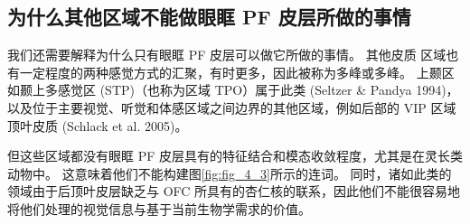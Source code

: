 \subsection{为什么其他区域不能做眼眶 PF 皮层所做的事情}
我们还需要解释为什么只有眼眶 PF 皮层可以做它所做的事情。 其他皮质
区域也有一定程度的两种感觉方式的汇聚，有时更多，因此被称为多峰或多峰。 上颞区如颞上多感觉区 (STP)（也称为区域 TPO）属于此类
(Seltzer \& Pandya 1994)，以及位于主要视觉、听觉和体感区域之间边界的其他区域，例如后部的 VIP 区域顶叶皮质 (Schlack et al. 2005)。\par
但这些区域都没有眼眶 PF 皮层具有的特征结合和模态收敛程度，尤其是在灵长类动物中。 这意味着他们不能构建图\ref{fig:fig_4_3}所示的连词。 同时，诸如此类的领域由于后顶叶皮层缺乏与 OFC 所具有的杏仁核的联系，因此他们不能很容易地将他们处理的视觉信息与基于当前生物学需求的价值。\par
